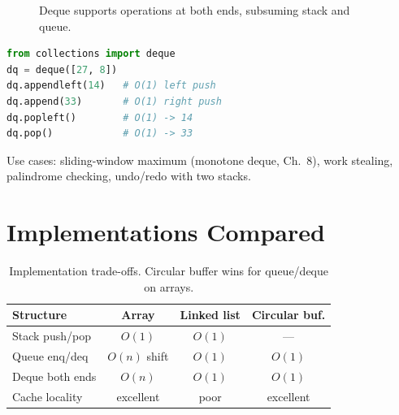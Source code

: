 \begin{figure}[h]
\centering
{}
\caption{Deque supports operations at both ends, subsuming stack and queue.}
\label{fig:deque}
\end{figure}

\begin{lstlisting}[language=Python]
from collections import deque
dq = deque([27, 8])
dq.appendleft(14)   # O(1) left push
dq.append(33)       # O(1) right push
dq.popleft()        # O(1) -> 14
dq.pop()            # O(1) -> 33
\end{lstlisting}

Use cases: sliding-window maximum (monotone deque, Ch.~8), work stealing, palindrome checking, undo/redo with two stacks.

\section{Implementations Compared}

\begin{table}[h]
\centering
\small
\begin{tabular}{lccc}
\toprule
Structure & Array & Linked list & Circular buf. \\
\midrule
Stack push/pop & $O(1)$ & $O(1)$ & --- \\
Queue enq/deq & $O(n)$ shift & $O(1)$ & $O(1)$ \\
Deque both ends & $O(n)$ & $O(1)$ & $O(1)$ \\
Cache locality & excellent & poor & excellent \\
\bottomrule
\end{tabular}
\caption{Implementation trade-offs. Circular buffer wins for queue/deque on arrays.}
\label{tab:stack-queue-impl}
\end{table}

